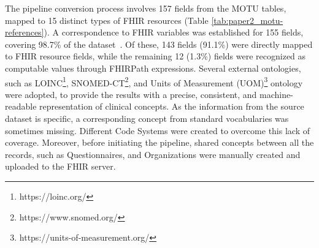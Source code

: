 The pipeline conversion process involves 157 fields from the MOTU tables, mapped to 15 distinct types of FHIR resources (Table \ref{tab:paper2_motu-references}). A correspondence to FHIR variables was established for 155 fields, covering 98.7\% of the dataset~\cite{arcobelli2024fhir}. Of these, 143 fields (91.1\%) were directly mapped to FHIR resource fields, while the remaining 12 (1.3\%) fields were recognized as computable values through FHIRPath expressions.
Several external ontologies, such as LOINC\footnote{https://loinc.org/}, SNOMED-CT\footnote{https://www.snomed.org/}, and Units of Measurement (UOM)\footnote{https://units-of-measurement.org/} ontology were adopted, to provide the results with a precise, consistent, and machine-readable representation of clinical concepts. As the information from the source dataset is specific, a corresponding concept from standard vocabularies was sometimes missing. Different Code Systems were created to overcome this lack of coverage. Moreover, before initiating the pipeline, shared concepts between all the records, such as Questionnaires, and Organizations were manually created and uploaded to the FHIR server. 


